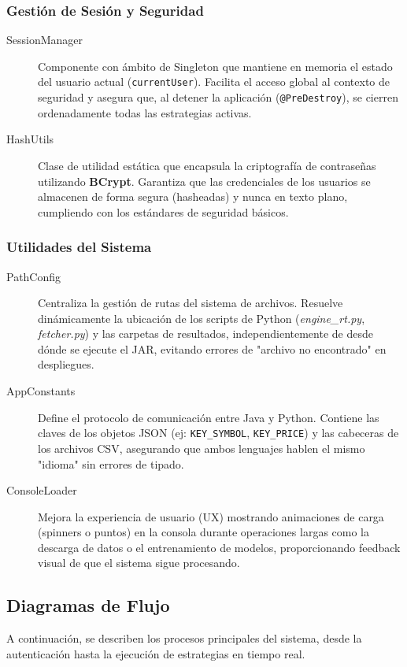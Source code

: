 \documentclass[12pt, letterpaper]{article}
\begin{document}
\subsubsection{Gestión de Sesión y Seguridad}
\begin{description}
    \item[SessionManager] Componente con ámbito de Singleton que mantiene en memoria el estado del usuario actual (\texttt{currentUser}). Facilita el acceso global al contexto de seguridad y asegura que, al detener la aplicación (\texttt{@PreDestroy}), se cierren ordenadamente todas las estrategias activas.
    
    \item[HashUtils] Clase de utilidad estática que encapsula la criptografía de contraseñas utilizando \textbf{BCrypt}. Garantiza que las credenciales de los usuarios se almacenen de forma segura (hasheadas) y nunca en texto plano, cumpliendo con los estándares de seguridad básicos.
\end{description}

\subsubsection{Utilidades del Sistema}
\begin{description}
    \item[PathConfig] Centraliza la gestión de rutas del sistema de archivos. Resuelve dinámicamente la ubicación de los scripts de Python (\textit{engine\_rt.py}, \textit{fetcher.py}) y las carpetas de resultados, independientemente de desde dónde se ejecute el JAR, evitando errores de "archivo no encontrado" en despliegues.
    
    \item[AppConstants] Define el protocolo de comunicación entre Java y Python. Contiene las claves de los objetos JSON (ej: \texttt{KEY\_SYMBOL}, \texttt{KEY\_PRICE}) y las cabeceras de los archivos CSV, asegurando que ambos lenguajes hablen el mismo "idioma" sin errores de tipado.
    
    \item[ConsoleLoader] Mejora la experiencia de usuario (UX) mostrando animaciones de carga (spinners o puntos) en la consola durante operaciones largas como la descarga de datos o el entrenamiento de modelos, proporcionando feedback visual de que el sistema sigue procesando.
\end{description}

\subsection{Diagramas de Flujo}
A continuación, se describen los procesos principales del sistema, desde la autenticación hasta la ejecución de estrategias en tiempo real.
\end{document}
